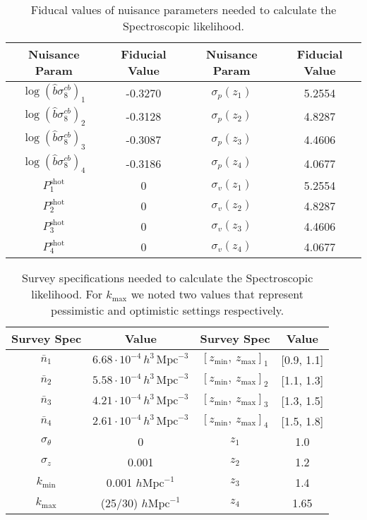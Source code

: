\documentclass[../main.tex]{subfiles}
\begin{document}
\begin{table}
    \centering
    \begin{tabular}{c|c||c|c}
        \hline
        \rowcolor{cyan}Nuisance Param &Fiducial Value&Nuisance Param &Fiducial Value\\
    \hline
    $\log\left(\hat{b}\sigma_8^{cb}\right)_1$ & -0.3270 & $\sigma_p(z_1)$ & 5.2554\\  
    $\log\left(\hat{b}\sigma_8^{cb}\right)_2$ & -0.3128 & $\sigma_p(z_2)$ & 4.8287\\  
    $\log\left(\hat{b}\sigma_8^{cb}\right)_3$ & -0.3087 & $\sigma_p(z_3)$ & 4.4606\\  
    $\log\left(\hat{b}\sigma_8^{cb}\right)_4$ & -0.3186 & $\sigma_p(z_4)$ & 4.0677\\  
    $ P_1^\mathrm{shot}$ & 0                            & $\sigma_v(z_1)$ & 5.2554\\  
    $ P_2^\mathrm{shot}$ & 0                            & $\sigma_v(z_2)$ & 4.8287\\  
    $ P_3^\mathrm{shot}$ & 0                            & $\sigma_v(z_3)$ & 4.4606\\  
    $ P_4^\mathrm{shot}$ & 0                            & $\sigma_v(z_4)$ & 4.0677\\  
\end{tabular}
\caption{Fiducal values of nuisance parameters needed to calculate the Spectroscopic likelihood.}
\label{tab:spectro_nuisance}
\end{table}

\begin{table}
    \centering
    
    \begin{tabular}{c|c||c|c}
        \hline
        \rowcolor{cyan}Survey Spec& Value&Survey Spec& Value\\
    \hline
     $\bar{n}_1$ & $6.68\cdot10^{-4}\,h^{3}\,\mathrm{Mpc}^{-3}$           &$[z_\mathrm{min},\:z_\mathrm{max}]_1$ & [0.9, 1.1]\\
     $\bar{n}_2$ & $5.58\cdot10^{-4}\,h^{3}\,\mathrm{Mpc}^{-3}$           &$[z_\mathrm{min},\:z_\mathrm{max}]_2$ & [1.1, 1.3]\\
     $\bar{n}_3$ & $4.21\cdot10^{-4}\,h^{3}\,\mathrm{Mpc}^{-3}$           &$[z_\mathrm{min},\:z_\mathrm{max}]_3$ & [1.3, 1.5]\\
     $\bar{n}_4$ & $2.61\cdot10^{-4}\,h^{3}\,\mathrm{Mpc}^{-3}$           &$[z_\mathrm{min},\:z_\mathrm{max}]_4$ & [1.5, 1.8]\\
     $\sigma_\theta$      & 0                            &$z_1$&1.0\\
     $\sigma_z$           & 0.001                        &$z_2$&1.2\\
     $k_\mathrm{min}$     & 0.001 $h \mathrm{Mpc}^{-1}  $&$z_3$&1.4\\
     $k_\mathrm{max}$     & (25/30) $h \mathrm{Mpc}^{-1}$&$z_4$&1.65\\
\end{tabular}
\caption{Survey specifications needed to calculate the Spectroscopic likelihood. For $k_\mathrm{max}$ we noted two values that represent pessimistic and optimistic settings respectively.}
\label{tab:spectro_specifics}
\end{table}
\end{document}

